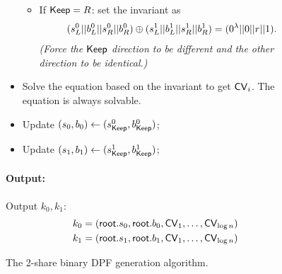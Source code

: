 \begin{figure}
\begin{minipage}{\textwidth}
\begin{mdframed}
\begin{itemize}
\begin{itemize}
                        \item If ${\sf Keep}=R$: set the invariant as 
                        \begin{align*}
                            (s^0_L || b^0_L || s^0_R || b^0_R) \oplus (s^1_L || b^1_L || s^1_R || b^1_R) = (0^{\lambda} || 0 || r || 1).
                        \end{align*}
                        \hfill \textit{(Force the ${\sf Keep}$ direction to be different and the other direction to be identical.)}
                    \end{itemize}
                    \item Solve the equation based on the invariant to get ${\sf CV}_i$. The equation is always solvable.
                    \item Update $(s_0, b_0) \leftarrow (s^0_{\sf Keep}, b^0_{\sf Keep})$;
                    \item Update $(s_1, b_1) \leftarrow (s^1_{\sf Keep}, b^1_{\sf Keep})$;
                \end{itemize}  
            \paragraph{Output:} Output $k_0, k_1$:
            \begin{align*}
                k_0=({\sf root}.s_0, {\sf root}.b_0, {\sf CV}_1,\dots,{\sf CV}_{\log n}) \\
                k_1=({\sf root}.s_1, {\sf root}.b_1, {\sf CV}_1,\dots,{\sf CV}_{\log n})
            \end{align*}
            
        \end{mdframed}
    \end{minipage}
    \caption{The 2-share binary DPF generation algorithm.\label{fig:DPF}}
\end{figure}

